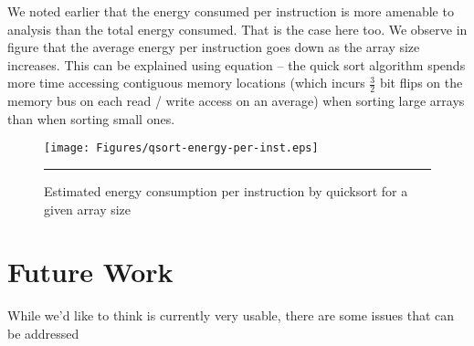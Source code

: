 We noted earlier that the energy consumed per instruction is more
amenable to analysis than the total energy consumed.  That is the case
here too.  We observe in figure
 that the average
energy per instruction goes down as the array size increases.  This
can be explained using equation  -- the quick
sort algorithm spends more time accessing contiguous memory locations
(which incurs $\frac{3}{2}$ bit flips on the memory bus on each read /
write access on an average) when sorting large arrays than when
sorting small ones.

\begin{figure}[hp]
  \centering
  \texttt{[image: Figures/qsort-energy-per-inst.eps]}
  \rule{35em}{0.5pt}
  \caption{Estimated energy consumption per instruction by quicksort
    for a given array size}
  \label{fig:qsort-energy-per-inst-per-array-length}
\end{figure}

\section{Future Work}

While we'd like to think \wattage is currently very usable, there are
some issues that can be addressed

